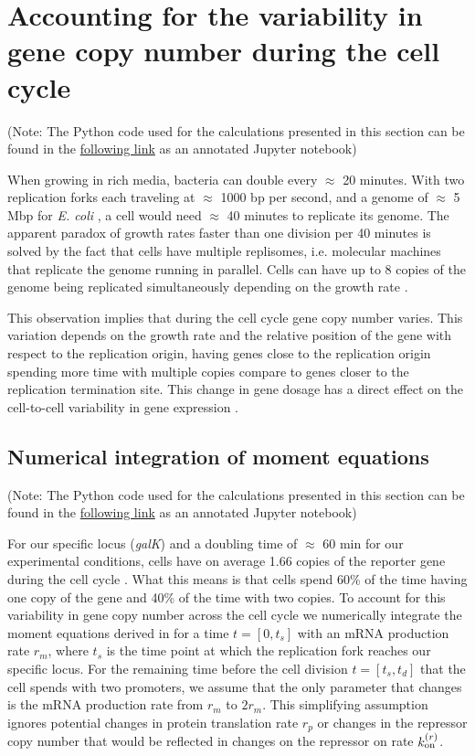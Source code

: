 \section{Accounting for the variability in gene copy number during the cell
cycle} \label{supp_multi_gene}

(Note: The Python code used for the calculations presented in this section can
be found in the
\href{https://www.rpgroup.caltech.edu/chann_cap/src/theory/html/moment_dynamics_cell_division.html}{following
link} as an annotated Jupyter notebook)

When growing in rich media, bacteria can double every $\approx$ 20 minutes.
With two replication forks each traveling at $\approx$ 1000 bp per second, and
a genome of $\approx$ 5 Mbp for {\it E. coli} \cite{Moran2010}, a cell would
need $\approx$ 40 minutes to replicate its genome. The apparent paradox  of
growth rates faster than one division per 40 minutes is solved by the fact that
cells have multiple replisomes, i.e. molecular machines that replicate the
genome running in parallel. Cells can have up to 8 copies of the genome being
replicated simultaneously depending on the growth rate \cite{Bremer1996}.

This observation implies that during the cell cycle gene copy number varies.
This variation depends on the growth rate and the relative position of the gene
with respect to the replication origin, having genes close to the replication
origin spending more time with multiple copies compare to genes closer to the
replication termination site. This change in gene dosage has a direct effect on
the cell-to-cell variability in gene expression \cite{Jones2014a,
Peterson2015}.

\subsection{Numerical integration of moment equations}

(Note: The Python code used for the calculations presented in this section can
be found in the
\href{https://www.rpgroup.caltech.edu//chann_cap/software/moment_dynamics_cell_division.html}{following
link} as an annotated Jupyter notebook)

For our specific locus ({\it galK}) and a doubling time of $\approx$ 60 min for
our experimental conditions, cells have on average 1.66 copies of the reporter
gene during the cell cycle \cite{Jones2014a}. What this means is that cells
spend 60\% of the time having one copy of the gene and 40\% of the time with
two copies. To account for this variability in gene copy number across the cell
cycle we numerically integrate the moment equations derived in
 for a time $t = [0, t_s]$ with an mRNA production rate
$r_m$, where $t_s$ is the time point at which the replication fork reaches our
specific locus. For the remaining time before the cell division $t = [t_s,
t_d]$ that the cell spends with two promoters, we assume that the only
parameter that changes is the mRNA production rate from $r_m$ to $2 r_m$. This
simplifying assumption ignores potential changes in protein translation rate
$r_p$ or changes in the repressor copy number that would be reflected in
changes on the repressor on rate $k^{(r)}_{\text{on}}$.

